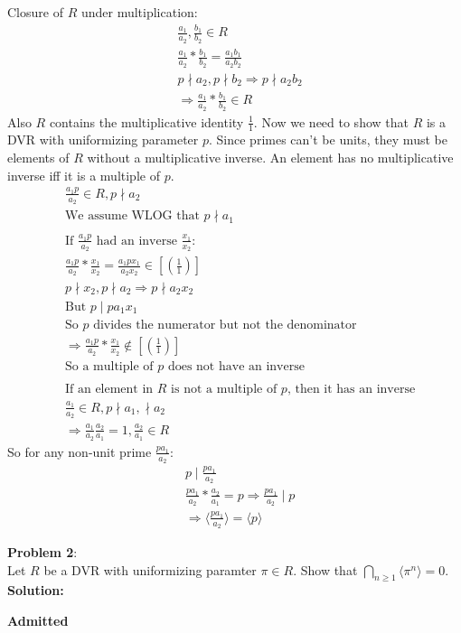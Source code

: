 \documentclass[11pt]{article}
\newcommand{\prob}[3]{\begin{flushleft}
        \textbf{Problem #1}: \\
        #2 
		\textbf{Solution:} 
		#3

\end{flushleft}}
\newcommand{\admit}{
  \begin{flushright}
    \textbf{Admitted}
  \end{flushright}
}
\begin{document}
{Closure of $R$ under multiplication:
\begin{align*}
&\frac{a_1}{a_2}, \frac{b_1}{b_2} \in R\\
&\frac{a_1}{a_2}* \frac{b_1}{b_2} = \frac{a_1b_1}{a_2b_2}\\
&p \nmid a_2, p \nmid b_2 \Rightarrow p \nmid a_2b_2\\
&\Rightarrow \frac{a_1}{a_2}* \frac{b_1}{b_2} \in R
\end{align*}
Also $R$ contains the multiplicative identity $\frac{1}{1}$.
\newline
Now we need to show that $R$ is a DVR with uniformizing parameter $p$.
\newline
Since primes can't be units, they must be elements of $R$ without a multiplicative inverse. An element has no multiplicative inverse iff it is a multiple of $p$.
\begin{align*}
&\frac{a_1p}{a_2} \in R, p \nmid a_2\\
&\text{We assume WLOG that $p \nmid a_1$}\\
&\\
&\text{If $\frac{a_1p}{a_2}$ had an inverse $\frac{x_1}{x_2}$:}\\
&\frac{a_1p}{a_2}*\frac{x_1}{x_2} = \frac{a_1px_1}{a_2x_2} \in \left[ \left( \frac{1}{1} \right) \right]\\
& p \nmid x_2, p \nmid a_2 \Rightarrow p \nmid a_2x_2\\
&\text{But } p \mid pa_1x_1 \\
&\text{So $p$ divides the numerator but not the denominator}\\
&\Rightarrow \frac{a_1p}{a_2}*\frac{x_1}{x_2} \notin \left[ \left( \frac{1}{1} \right) \right]\\
&\text{So a multiple of $p$ does not have an inverse}\\
&\\
&\text{If an element in $R$ is not a multiple of $p$, then it has an inverse}\\
&\frac{a_1}{a_2} \in R, p \nmid a_1, \nmid a_2\\
&\Rightarrow \frac{a_1}{a_2}\frac{a_2}{a_1} = 1, \frac{a_2}{a_1} \in R
\end{align*}
So for any non-unit prime $\frac{pa_1}{a_2}$:
\begin{align*}
&p \mid \frac{pa_1}{a_2}\\
&\frac{pa_1}{a_2} * \frac{a_2}{a_1} = p \Rightarrow \frac{pa_1}{a_2} \mid p\\
&\Rightarrow \langle \frac{pa_1}{a_2} \rangle = \langle p \rangle
\end{align*}
}
\prob{2}{
  Let $R$ be a DVR with uniformizing paramter $\pi \in R$. Show that $\bigcap_{n \geq 1} \langle \pi^n \rangle = 0$. \\
}{ \\
  \admit
}
\end{document}
